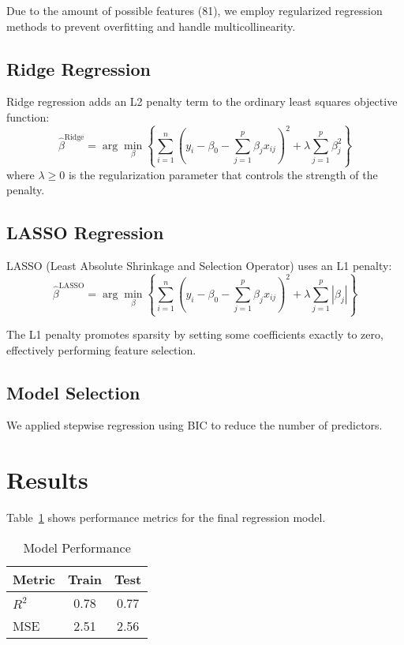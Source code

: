 \documentclass[conference]{IEEEtran}
\begin{document}
Due to the amount of possible features (81), we employ regularized regression methods to prevent overfitting and handle multicollinearity.

\subsection{Ridge Regression}
Ridge regression adds an L2 penalty term to the ordinary least squares objective function:
\[
\hat{\beta}^{\text{Ridge}} = \arg\min_{\beta} \left\{ \sum_{i=1}^{n} (y_i - \beta_0 - \sum_{j=1}^{p} \beta_j x_{ij})^2 + \lambda \sum_{j=1}^{p} \beta_j^2 \right\}
\]
where $\lambda \geq 0$ is the regularization parameter that controls the strength of the penalty.

\subsection{LASSO Regression}
LASSO (Least Absolute Shrinkage and Selection Operator) uses an L1 penalty:
\[
\hat{\beta}^{\text{LASSO}} = \arg\min_{\beta} \left\{ \sum_{i=1}^{n} (y_i - \beta_0 - \sum_{j=1}^{p} \beta_j x_{ij})^2 + \lambda \sum_{j=1}^{p} |\beta_j| \right\}
\]

The L1 penalty promotes sparsity by setting some coefficients exactly to zero, effectively performing feature selection.

\subsection{Model Selection}
We applied stepwise regression using BIC to reduce the number of predictors.

\section{Results}
Table~\ref{tab:results} shows performance metrics for the final regression model.

\begin{table}[htbp]
  \caption{Model Performance}
  \centering
  \begin{tabular}{lcc}
    \toprule
    Metric & Train & Test \\
    \midrule
    $R^2$       & 0.78 & 0.77 \\
    MSE         & 2.51 & 2.56 \\
    \bottomrule
  \end{tabular}
  \label{tab:results}
\end{table}
\end{document}

